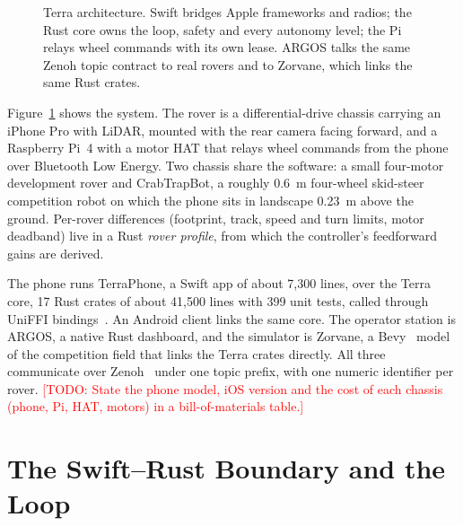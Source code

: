 \documentclass[conference]{IEEEtran}
\newcommand{\todo}[1]{\textcolor{red}{[TODO: #1]}}
\begin{document}
\begin{figure}[t]
\caption{Terra architecture. Swift bridges Apple frameworks and radios; the Rust core owns the loop, safety and every autonomy level; the Pi relays wheel commands with its own lease. ARGOS talks the same Zenoh topic contract to real rovers and to Zorvane, which links the same Rust crates.}
\label{fig:arch}
\end{figure}

Figure~\ref{fig:arch} shows the system.
The rover is a differential-drive chassis carrying an iPhone Pro with LiDAR, mounted with the rear camera facing forward, and a Raspberry Pi~4 with a motor HAT that relays wheel commands from the phone over Bluetooth Low Energy.
Two chassis share the software: a small four-motor development rover and CrabTrapBot, a roughly 0.6~m four-wheel skid-steer competition robot on which the phone sits in landscape 0.23~m above the ground.
Per-rover differences (footprint, track, speed and turn limits, motor deadband) live in a Rust \emph{rover profile}, from which the controller's feedforward gains are derived.

The phone runs TerraPhone, a Swift app of about 7{,}300 lines, over the Terra core, 17 Rust crates of about 41{,}500 lines with 399 unit tests, called through UniFFI bindings~\cite{uniffi2026}.
An Android client links the same core.
The operator station is ARGOS, a native Rust dashboard, and the simulator is Zorvane, a Bevy~\cite{bevy2026} model of the competition field that links the Terra crates directly.
All three communicate over Zenoh~\cite{zenoh2026} under one topic prefix, with one numeric identifier per rover.
\todo{State the phone model, iOS version and the cost of each chassis (phone, Pi, HAT, motors) in a bill-of-materials table.}

\section{The Swift--Rust Boundary and the Loop}
\label{sec:loop}
\end{document}
